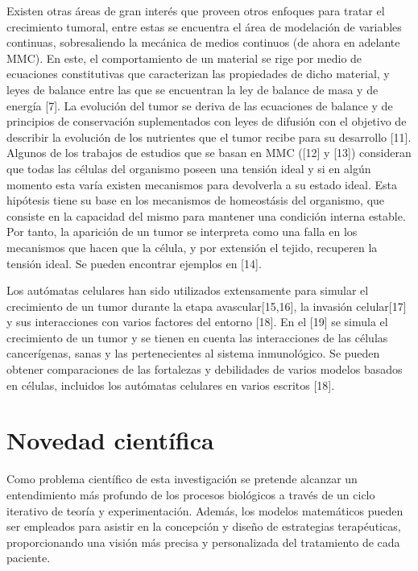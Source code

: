 \hspace{.1cm}Existen otras áreas de gran interés que proveen otros enfoques para tratar el crecimiento tumoral, entre estas se encuentra el \'area de modelaci\'on de variables continuas, sobresaliendo la mecánica de medios continuos (de ahora en adelante MMC). En este, el comportamiento de un material se rige por medio de ecuaciones constitutivas que caracterizan las propiedades de dicho material, y leyes de balance entre las que se encuentran la ley de balance de masa y de energía [7]. La evolución del tumor se deriva de las ecuaciones de balance y de principios de conservación suplementados con leyes de difusión con el objetivo de describir la evolución de los nutrientes que el tumor recibe para su desarrollo [11]. Algunos de los trabajos de estudios que se basan en MMC ([12] y [13]) consideran que todas las células del organismo poseen una tensión ideal y si en algún momento esta varía existen mecanismos para devolverla a su estado ideal. Esta hipótesis tiene su base en los mecanismos de homeost\'asis del organismo, que consiste en la capacidad del mismo para mantener una condición interna estable. Por tanto, la aparición de un tumor se interpreta como una falla en los mecanismos que hacen que la célula, y por extensión el tejido, recuperen la tensión ideal. Se pueden encontrar ejemplos en [14].

\hspace{.1cm}Los autómatas celulares han sido utilizados extensamente para simular el crecimiento de un tumor durante la etapa avascular[15,16], la invasión celular[17] y sus interacciones con varios factores del entorno [18]. En el [19] se simula el crecimiento de un tumor y se tienen en cuenta las interacciones de las células cancerígenas, sanas y las pertenecientes al sistema inmunológico. Se pueden obtener comparaciones de las fortalezas y debilidades de varios modelos basados en células, incluidos los autómatas celulares en varios escritos [18].

\section{Novedad científica} 
\hspace{.1cm}Como problema cient\'ifico de esta investigación se pretende alcanzar un entendimiento más profundo de los procesos biológicos a través de un ciclo iterativo de teoría y experimentación. Además, los modelos matemáticos pueden ser empleados para asistir en la concepción y diseño de estrategias terapéuticas, proporcionando una visión más precisa y personalizada del tratamiento de cada paciente.

